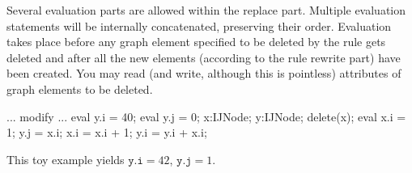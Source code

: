 Several evaluation parts are allowed within the replace part.
Multiple evaluation statements will be internally concatenated, preserving their order.
Evaluation takes place before any graph element specified to be deleted by the rule gets deleted and after all the new elements (according to the rule rewrite part) have been created.
You may read (and write, although this is pointless) attributes of graph elements to be deleted.

\begin{example}
\begin{grgen}
...
modify {
  ...
  eval { y.i = 40; }
  eval { y.j = 0;  }
  x:IJNode;
  y:IJNode;
  delete(x);
  eval {
    x.i = 1;
    y.j = x.i;
    x.i = x.i + 1;
    y.i = y.i + x.i;
  }
}
\end{grgen}
This toy example yields $\texttt{y.i} = 42$, $\texttt{y.j} = 1$.
\end{example}


